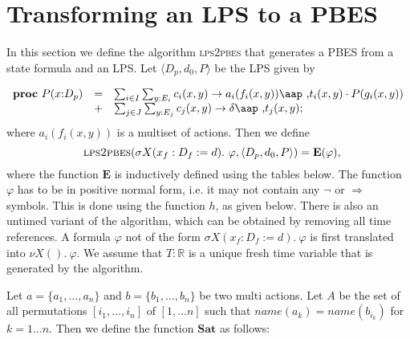 \documentclass{article}
\begin{document}
\section{Transforming an LPS to a PBES}

In this section we define the algorithm \textsc{lps2pbes} that generates a
PBES from a state formula and an LPS. Let $\langle {D_{p},d_{0},P}\rangle $
be the LPS given by

\begin{equation*}
\begin{array}{lrl}
\mathbf{proc}~P(x{:}D_{p}) & = & \sum_{i\in
I}\sum_{y:E_{i}}c_{i}(x,y)\rightarrow a_{i}(f_{i}(x,y))\mbox{\aap ,}%
t_{i}(x,y)\cdot P(g_{i}(x,y)) \\ 
& + & \sum_{j\in J}\sum_{y:E_{j}}c_{j}(x,y)\rightarrow \delta \mbox{\aap ,}%
t_{j}(x,y);%
\end{array}%
\end{equation*}%
where $a_{i}(f_{i}(x,y))$ is a multiset of actions. Then we define 
\begin{equation*}
\text{\textsc{lps2pbes}}(\sigma X(x_{f}:D_{f}:=d).~\varphi ,\langle {%
D_{p},d_{0},P}\rangle )=\mathbf{E}(\varphi ),
\end{equation*}%
where the function $\mathbf{E}$ is inductively defined using the tables
below. The function $\varphi $ has to be in positive normal form, i.e. it
may not contain any $\lnot $ or $\Rightarrow $ symbols. This is done using
the function $h$, as given below. There is also an untimed variant of the
algorithm, which can be obtained by removing all time references. A formula $%
\varphi $ not of the form $\sigma X(x_{f}:D_{f}:=d).~\varphi $ is first
translated into $\nu X().~\varphi $. We assume that $T:\mathbb{R}$ is a
unique fresh time variable that is generated by the algorithm.

\vspace{1cm}

Let $a=\{a_{1},\ldots ,a_{n}\}$ and $b=\{b_{1},\ldots ,b_{n}\}$ be two multi
actions. Let $A$ be the set of all permutations $[i_{1},\ldots ,i_{n}]$ of $%
[1,\ldots n]$ such that $name(a_{k})=name(b_{i_{k}})$ for $k=1\ldots n$.
Then we define the function $\mathbf{Sat}$ as follows:
\end{document}
